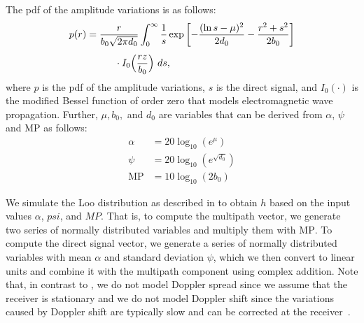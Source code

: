 \documentclass[conference]{IEEEtran}
\newcommand\MP{\ensuremath{\mathrm{MP}}\xspace}
\begin{document}
The \ac{pdf} of the amplitude variations is as follows:
\begin{align}
  p(r) &= \frac{r}{b_0\sqrt{2\pi d_0}} \nonumber
  \int_{0}^{\infty}\frac{1}{s} \exp\left[-\frac{(\ln s - \mu)^2}{2d_0} - \frac{r^2 + s^2}{2b_0}\right] \\[1ex]
  &\hphantom{=\int_{0}^{\infty}} \cdot I_0\Big(\frac{rz}{b_0}\Big)\ ds,
\end{align}
%
where $p$ is the \ac{pdf} of the amplitude variations, $s$ is the direct signal, and $I_0(\cdot)$ is the modified Bessel function of order zero that models electromagnetic wave propagation.
Further, $\mu, b_0,$ and $d_0$ are variables that can be derived from $\alpha$, $\psi$ and \MP as follows:
%
\begin{align}
\alpha &= 20\log_{10}(e^\mu) \\
  \psi &= 20\log_{10}(e^{\sqrt{d_0}}) \\
   \MP &= 10\log_{10}(2b_0)
\end{align}

We simulate the Loo distribution as described in \cite{DBLP:journals/ijscn/Perez-FontanMMPMMR08} to obtain $h$ based on the input values $\alpha$, $psi$, and $MP$.
That is, to compute the multipath vector, we generate two series of normally distributed variables and multiply them with \MP.
To compute the direct signal vector, we generate a series of normally distributed variables with mean $\alpha$ and standard deviation $\psi$, which we then convert to linear units and combine it with the multipath component using complex addition.
Note that, in contrast to \cite{DBLP:journals/ijscn/Perez-FontanMMPMMR08}, we do not model Doppler spread since we assume that the receiver is stationary and we do not model Doppler shift since the variations caused by Doppler shift are typically slow and can be corrected at the receiver~\cite{DBLP:journals/ijscn/Perez-FontanMMPMMR08}. 



\end{document}
